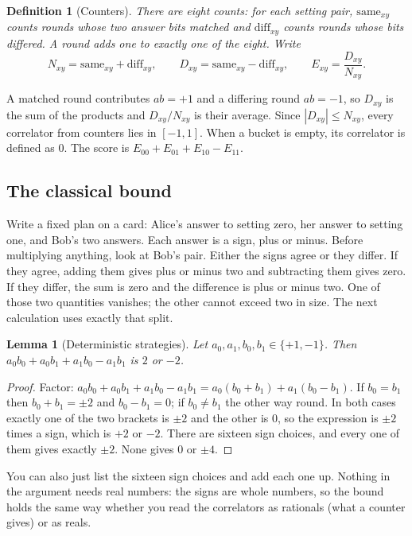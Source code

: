 \documentclass[11pt,twoside]{article}
\theoremstyle{thielethm}
\newtheorem{lemma}[theorem]{Lemma}
\theoremstyle{thieledef}
\newtheorem{definition}{Definition}[section]
\theoremstyle{thieledef}
\theoremstyle{thieledef}
\theoremstyle{thielethm}
\theoremstyle{thieleobs}
\theoremstyle{thielethm}
\begin{document}
\begin{definition}[Counters]
There are eight counts: for each setting pair, $\mathrm{same}_{xy}$ counts rounds
whose two answer bits matched and $\mathrm{diff}_{xy}$ counts rounds whose bits differed. A
round adds one to exactly one of the eight. Write
\[
N_{xy} = \mathrm{same}_{xy} + \mathrm{diff}_{xy}, \qquad
D_{xy} = \mathrm{same}_{xy} - \mathrm{diff}_{xy}, \qquad
E_{xy} = \frac{D_{xy}}{N_{xy}}.
\]
\end{definition}

A matched round contributes $ab = +1$ and a differing round $ab = -1$, so $D_{xy}$ is the sum
of the products and $D_{xy}/N_{xy}$ is their average. Since $|D_{xy}| \le N_{xy}$, every
correlator from counters lies in $[-1,1]$. When a bucket is empty, its correlator is defined
as 0. The score is $E_{00}+E_{01}+E_{10}-E_{11}$.

\subsection{The classical bound}


Write a fixed plan on a card: Alice's answer to setting zero, her answer to
setting one, and Bob's two answers. Each answer is a sign, plus or minus.
Before multiplying anything, look at Bob's pair. Either the signs agree or
they differ. If they agree, adding them gives plus or minus two and subtracting
them gives zero. If they differ, the sum is zero and the difference is plus
or minus two. One of those two quantities vanishes; the other cannot exceed
two in size. The next calculation uses exactly that split.

\begin{lemma}[Deterministic strategies]\label{lem:chsh-deterministic}
Let $a_0, a_1, b_0, b_1 \in \{+1, -1\}$. Then $a_0 b_0 + a_0 b_1 + a_1 b_0 - a_1 b_1$ is $2$ or $-2$.
\end{lemma}

\begin{proof}
Factor: $a_0 b_0 + a_0 b_1 + a_1 b_0 - a_1 b_1 = a_0(b_0 + b_1) + a_1(b_0 - b_1)$. If
$b_0 = b_1$ then $b_0 + b_1 = \pm 2$ and $b_0 - b_1 = 0$; if $b_0 \ne b_1$ the other way
round. In both cases exactly one of the two brackets is $\pm 2$ and the other is $0$, so the
expression is $\pm 2$ times a sign, which is $+2$ or $-2$. There are sixteen sign choices,
and every one of them gives exactly $\pm 2$. None gives $0$ or $\pm 4$.
\end{proof}

You can also just list the sixteen sign choices and add each one up. Nothing in the argument needs real
numbers: the signs are whole numbers, so the bound holds the same way whether you read the
correlators as rationals (what a counter gives) or as reals.
\end{document}
